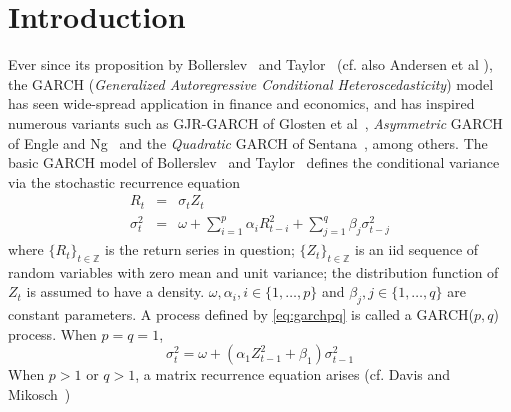 \documentclass[aoas,preprint]{imsart}
\numberwithin{equation}{section}
\theoremstyle{plain}
\begin{document}
\section{Introduction}
Ever since its proposition by Bollerslev~\cite{bollerslev:1986} and
Taylor~\cite{taylor:2008} (cf. also Andersen et al
\cite{andersen:davis:kreiss:mikosch:2009}), the GARCH 
({\em Generalized Autoregressive Conditional Heteroscedasticity}) model
has seen wide-spread application in finance and economics, and has
inspired numerous variants such as GJR-GARCH of Glosten et
al~\cite{glosten:1993}, {\em Asymmetric} GARCH of Engle and
Ng~\cite{engle:Ng:1993} and the {\em Quadratic} GARCH of
Sentana~\cite{sentana:1995}, among others. The basic GARCH model of
Bollerslev~\cite{bollerslev:1986} and Taylor~\cite{taylor:2008}
defines the conditional variance via the stochastic recurrence
equation
\begin{eqnarray}
  R_t &=& \sigma_t Z_t \nonumber \\
  \sigma_{t}^2 &=& \omega + \sum_{i=1}^p \alpha_i R_{t-i}^2 + \sum_{j=1}^q
  \beta_j \sigma_{t-j}^2   \label{eq:garchpq}
\end{eqnarray}
where $\{R_t\}_{t \in \mathbb Z}$ is the return series in question;
$\{Z_t\}_{t \in \mathbb Z}$ is an iid sequence of random variables
with zero mean and unit variance; the distribution function of $Z_t$
is assumed to have a density.
$\omega, \alpha_i, i \in \{1,\dots,p\}$ and
$\beta_j, j \in \{1,\dots,q\}$ are constant parameters. A process
defined by \eqref{eq:garchpq} is called a GARCH($p,q$) process.
When $p = q = 1$,
\[
\sigma_t^2 = \omega + (\alpha_1 Z_{t-1}^2 + \beta_1) \sigma_{t-1}^2
\]
When $p > 1$ or $q > 1$, a matrix recurrence equation arises
(cf. Davis and Mikosch~\cite{davis:mikosch:2001})
\end{document}
